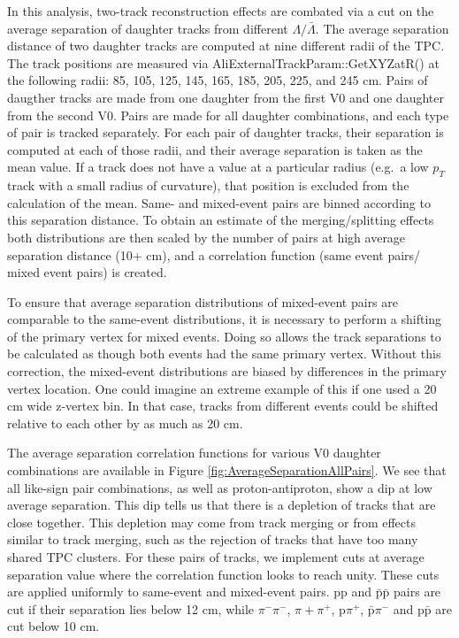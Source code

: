 In this analysis, two-track reconstruction effects are combated via a cut on the average separation of daughter tracks from different $\Lambda/\bar{\Lambda}$.  
The average separation distance of two daughter tracks are computed at nine different radii of the TPC.  
The track positions are measured via AliExternalTrackParam::GetXYZatR() at the following radii: 85, 105, 125, 145, 165, 185, 205, 225, and 245 cm.  
Pairs of daugther tracks are made from one daughter from the first V0 and one daughter from the second V0. Pairs are made for all daughter combinations, and each type of pair is tracked separately.
For each pair of daughter tracks, their separation is computed at each of those radii, and their average separation is taken as the mean value. If a track does not have a value at a particular radius (e.g.\ a low $p_T$ track with a small radius of curvature), that position is excluded from the calculation of the mean.
Same- and mixed-event pairs are binned according to this separation distance.  
To obtain an estimate of the merging/splitting effects both distributions are then scaled by the number of pairs at high average separation distance (10+ cm), and a correlation function (same event pairs/ mixed event pairs) is created. 

To ensure that average separation distributions of mixed-event pairs are comparable to the same-event distributions, it is necessary to perform a shifting of the primary vertex for mixed events.  
Doing so allows the track separations to be calculated as though both events had the same primary vertex.  
Without this correction, the mixed-event distributions are biased by differences in the primary vertex location.  
One could imagine an extreme example of this if one used a 20 cm wide z-vertex bin.  
In that case, tracks from different events could be shifted relative to each other by as much as 20 cm. 

The average separation correlation functions for various V0 daughter combinations are available in Figure \ref{fig:AverageSeparationAllPairs}.  
We see that all like-sign pair combinations, as well as proton-antiproton, show a dip at low average separation.  
This dip tells us that there is a depletion of tracks that are close together. 
This depletion may come from track merging or from effects similar to track merging, such as the rejection of tracks that have too many shared TPC clusters.
For these pairs of tracks, we implement cuts at average separation value where the correlation function looks to reach unity.
These cuts are applied uniformly to same-event and mixed-event pairs.
pp and $\bar{\mathrm{p}}\bar{\mathrm{p}}$ pairs are cut if their separation lies below 12 cm, while $\pi^-\pi^-$, $\pi+\pi^+$, p$\pi^+$, $\bar{\mathrm{p}}\pi^-$ and p$\bar{\mathrm{p}}$ are cut below 10 cm.

